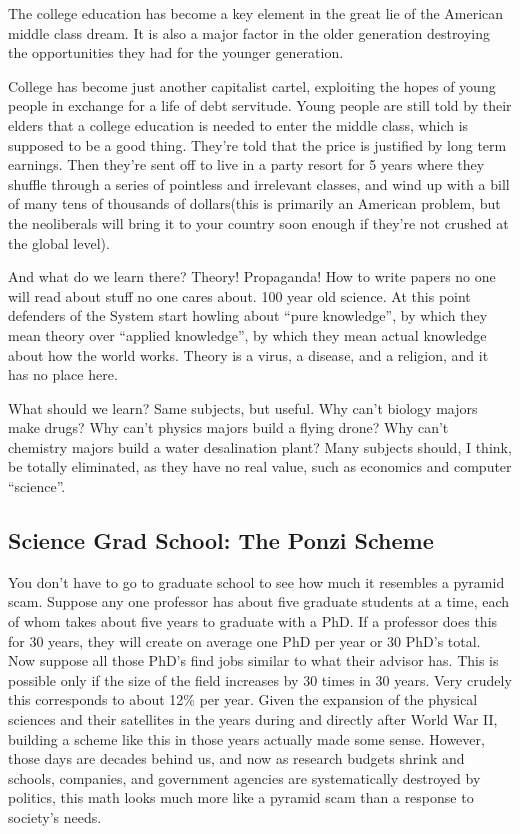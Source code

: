 The college education has become a key element in the great lie of the
American middle class dream. It is also a major factor in the older
generation destroying the opportunities they had for the younger
generation.

College has become just another capitalist cartel, exploiting the hopes
of young people in exchange for a life of debt servitude. Young people
are still told by their elders that a college education is needed to
enter the middle class, which is supposed to be a good thing. They're
told that the price is justified by long term earnings. Then they're
sent off to live in a party resort for 5 years where they shuffle
through a series of pointless and irrelevant classes, and wind up with a
bill of many tens of thousands of dollars(this is primarily an American
problem, but the neoliberals will bring it to your country soon enough
if they're not crushed at the global level).

And what do we learn there? Theory! Propaganda! How to write papers no
one will read about stuff no one cares about. 100 year old science. At
this point defenders of the System start howling about ``pure
knowledge'', by which they mean theory over ``applied knowledge'', by
which they mean actual knowledge about how the world works. Theory is a
virus, a disease, and a religion, and it has no place here.

What should we learn? Same subjects, but useful. Why can't biology
majors make drugs? Why can't physics majors build a flying drone? Why
can't chemistry majors build a water desalination plant? Many subjects
should, I think, be totally eliminated, as they have no real value, such
as economics and computer ``science''.

\subsection{Science Grad School: The Ponzi
Scheme}\label{science-grad-school-the-ponzi-scheme}

You don't have to go to graduate school to see how much it resembles a
pyramid scam. Suppose any one professor has about five graduate students
at a time, each of whom takes about five years to graduate with a PhD.
If a professor does this for 30 years, they will create on average one
PhD per year or 30 PhD's total. Now suppose all those PhD's find jobs
similar to what their advisor has. This is possible only if the size of
the field increases by 30 times in 30 years. Very crudely this
corresponds to about 12\% per year. Given the expansion of the physical
sciences and their satellites in the years during and directly after
World War II, building a scheme like this in those years actually made
some sense. However, those days are decades behind us, and now as
research budgets shrink and schools, companies, and government agencies
are systematically destroyed by politics, this math looks much more like
a pyramid scam than a response to society's needs.

